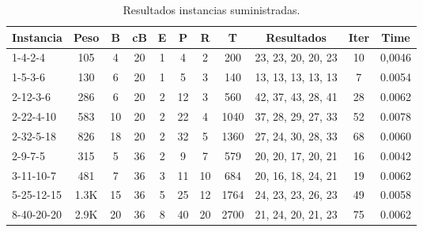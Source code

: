 \documentclass[letter, 10pt]{article}
\begin{document}
    \begin{table}[h!]
        \centering
        \caption{Resultados instancias suministradas.}
        \begin{tabular}{|l|c|c|c|c|c|c|c|c|c|c|}
            \hline
            \multicolumn{1}{|c|}{{\bf Instancia}} & {\bf Peso} & {\bf B} &
                    {\bf cB} & {\bf E} & {\bf P} & {\bf R} & {\bf T} & 
                    {\bf Resultados}   & {\bf Iter} & {\bf Time} \\ \hline
            1-4-2-4    & 105  & 4  & 20 & 1 & 4  & 2  & 200  & 
                    23, 23, 20, 20, 23 & 10 & 0,0046 \\ \hline
            1-5-3-6    & 130  & 6  & 20 & 1 & 5  & 3  & 140  & 
                    13, 13, 13, 13, 13 & 7  & 0.0054 \\ \hline
            2-12-3-6   & 286  & 6  & 20 & 2 & 12 & 3  & 560  &
                    42, 37, 43, 28, 41 & 28 & 0.0062 \\ \hline
            2-22-4-10  & 583  & 10 & 20 & 2 & 22 & 4  & 1040 &
                    37, 28, 29, 27, 33 & 52 & 0.0078 \\ \hline
            2-32-5-18  & 826  & 18 & 20 & 2 & 32 & 5  & 1360 &
                    27, 24, 30, 28, 33 & 68 & 0.0060 \\ \hline
            2-9-7-5    & 315  & 5  & 36 & 2 & 9  & 7  & 579  &
                    20, 20, 17, 20, 21 & 16 & 0.0042 \\ \hline
            3-11-10-7  & 481  & 7  & 36 & 3 & 11 & 10 & 684  &
                    20, 16, 18, 24, 21 & 19 & 0.0062 \\ \hline
            5-25-12-15 & 1.3K & 15 & 36 & 5 & 25 & 12 & 1764 &
                    24, 23, 23, 26, 23 & 49 & 0.0058 \\ \hline
            8-40-20-20 & 2.9K & 20 & 36 & 8 & 40 & 20 & 2700 &
                    21, 24, 20, 21, 23 & 75 & 0.0062 \\ \hline
        \end{tabular}
        \label{tabla1}
    \end{table}
\end{document}
